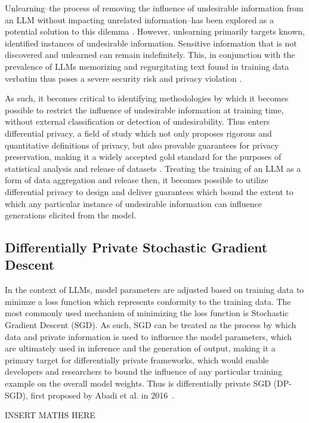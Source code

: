 \documentclass{article}
\begin{document}
Unlearning--the process of removing the influence of undesirable information from an LLM without impacting unrelated information--has been explored as a potential solution to this dilemma \cite{liu2024}. However, unlearning primarily targets known, identified instances of undesirable information. Sensitive information that is not discovered and unlearned can remain indefinitely. This, in conjunction with the prevalence of LLMs memorizing and  regurgitating text found in training data verbatim \cite{hartmann2023} thus poses a severe security risk and privacy violation \cite{menta2025}.

As such, it becomes critical to identifying methodologies by which it becomes possible to restrict the influence of undesirable information at training time, without external classification or detection of undesirability. Thus enters differential privacy, a field of study which not only proposes rigorous and quantitative definitions of privacy, but also provable guarantees for privacy preservation, making it a widely accepted gold standard for the purposes of statistical analysis and release of datasets \cite{fioretto2024}. Treating the training of an LLM as a form of data aggregation and release then, it becomes possible to utilize differential privacy to design and deliver guarantees which bound the extent to which any particular instance of undesirable information can influence generations elicited from the model. 

\subsection{Differentially Private Stochastic Gradient Descent}

In the context of LLMs, model parameters are adjusted based on training data to minimze a loss function which represents conformity to the training data. The most commonly used mechanism of minimizing the loss function is Stochastic Gradient Descent (SGD). As such, SGD can be treated as the process by which data and private information is used to influence the model parameters, which are ultimately used in inference and the generation of output, making it a primary target for differentially private frameworks, which would enable developers and researchers to bound the influence of any particular training example on the overall model weights. Thus is differentially private SGD (DP-SGD), first proposed by Abadi et al. in 2016\ \cite{abadi2016}. 

INSERT MATHS HERE
\end{document}

